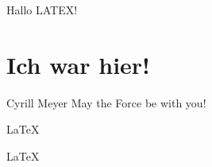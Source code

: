 \documentclass{article}
\begin{document}
Hallo LATEX!

\section{Ich war hier!}
Cyrill Meyer
May the Force be with you!

\LaTeX 

\huge
\LaTeX 
   
\end{document}
